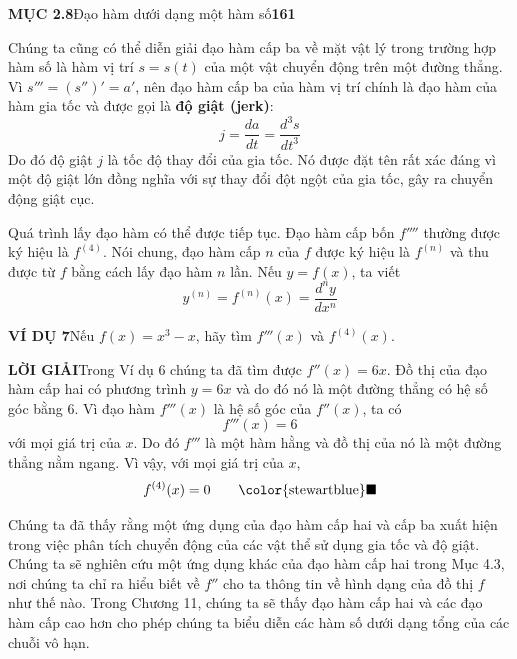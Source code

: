 \noindent\hspace*{160pt}\begin{minipage}{344pt}
  {\small\textbf{\textsf{\color{stewartblue}MỤC 2.8}}\quad \textsf{Đạo hàm dưới dạng một hàm số}\hfill \textbf{\textsf{161}}}
\end{minipage}
\vspace{0.8em}

\noindent\hspace*{160pt}\begin{minipage}{344pt}
  Chúng ta cũng có thể diễn giải đạo hàm cấp ba về mặt vật lý trong trường hợp hàm số là hàm vị trí $s = s(t)$ của một vật chuyển động trên một đường thẳng. Vì $s''' = (s'')' = a'$, nên đạo hàm cấp ba của hàm vị trí chính là đạo hàm của hàm gia tốc và được gọi là \textbf{độ giật (jerk)}:
  \[
    j = \frac{da}{dt} = \frac{d^3s}{dt^3}
  \]
  Do đó độ giật $j$ là tốc độ thay đổi của gia tốc. Nó được đặt tên rất xác đáng vì một độ giật lớn đồng nghĩa với sự thay đổi đột ngột của gia tốc, gây ra chuyển động giật cục.

  Quá trình lấy đạo hàm có thể được tiếp tục. Đạo hàm cấp bốn $f''''$ thường được ký hiệu là $f^{(4)}$. Nói chung, đạo hàm cấp $n$ của $f$ được ký hiệu là $f^{(n)}$ và thu được từ $f$ bằng cách lấy đạo hàm $n$ lần. Nếu $y = f(x)$, ta viết
  \[
    y^{(n)} = f^{(n)}(x) = \frac{d^ny}{dx^n}
  \]

  \textbf{\color{stewartblue}VÍ DỤ 7}\quad Nếu $f(x) = x^3 - x$, hãy tìm $f'''(x)$ và $f^{(4)}(x)$.

  \textbf{\color{stewartblue}LỜI GIẢI}\quad Trong Ví dụ 6 chúng ta đã tìm được $f''(x) = 6x$. Đồ thị của đạo hàm cấp hai có phương trình $y = 6x$ và do đó nó là một đường thẳng có hệ số góc bằng 6. Vì đạo hàm $f'''(x)$ là hệ số góc của $f''(x)$, ta có
  \[
    f'''(x) = 6
  \]
  với mọi giá trị của $x$. Do đó $f'''$ là một hàm hằng và đồ thị của nó là một đường thẳng nằm ngang. Vì vậy, với mọi giá trị của $x$,
  \[
    f^{(4)}(x) = 0 \tag*{\color{stewartblue}$\blacksquare$}
  \]

  Chúng ta đã thấy rằng một ứng dụng của đạo hàm cấp hai và cấp ba xuất hiện trong việc phân tích chuyển động của các vật thể sử dụng gia tốc và độ giật. Chúng ta sẽ nghiên cứu một ứng dụng khác của đạo hàm cấp hai trong Mục 4.3, nơi chúng ta chỉ ra hiểu biết về $f''$ cho ta thông tin về hình dạng của đồ thị $f$ như thế nào. Trong Chương 11, chúng ta sẽ thấy đạo hàm cấp hai và các đạo hàm cấp cao hơn cho phép chúng ta biểu diễn các hàm số dưới dạng tổng của các chuỗi vô hạn.
\end{minipage}

